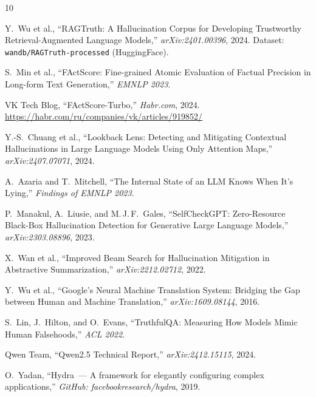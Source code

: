 \documentclass[a4paper,12pt]{extarticle}
\begin{document}
\begin{thebibliography}{10}

Y.~Wu et al.,
``RAGTruth: A Hallucination Corpus for Developing Trustworthy
Retrieval-Augmented Language Models,''
\textit{arXiv:2401.00396}, 2024.
Dataset: \texttt{wandb/RAGTruth-processed} (HuggingFace).

S.~Min et al.,
``FActScore: Fine-grained Atomic Evaluation of Factual Precision
in Long-form Text Generation,''
\textit{EMNLP 2023}.

VK Tech Blog,
``FActScore-Turbo,''
\textit{Habr.com}, 2024.
\url{https://habr.com/ru/companies/vk/articles/919852/}

Y.-S.~Chuang et al.,
``Lookback Lens: Detecting and Mitigating Contextual Hallucinations
in Large Language Models Using Only Attention Maps,''
\textit{arXiv:2407.07071}, 2024.

A.~Azaria and T.~Mitchell,
``The Internal State of an LLM Knows When It's Lying,''
\textit{Findings of EMNLP 2023}.

P.~Manakul, A.~Liusie, and M.\,J.\,F.~Gales,
``SelfCheckGPT: Zero-Resource Black-Box Hallucination Detection
for Generative Large Language Models,''
\textit{arXiv:2303.08896}, 2023.

X.~Wan et al.,
``Improved Beam Search for Hallucination Mitigation
in Abstractive Summarization,''
\textit{arXiv:2212.02712}, 2022.

Y.~Wu et al.,
``Google's Neural Machine Translation System: Bridging the Gap
between Human and Machine Translation,''
\textit{arXiv:1609.08144}, 2016.

S.~Lin, J.~Hilton, and O.~Evans,
``TruthfulQA: Measuring How Models Mimic Human Falsehoods,''
\textit{ACL 2022}.

Qwen Team,
``Qwen2.5 Technical Report,''
\textit{arXiv:2412.15115}, 2024.

O.~Yadan,
``Hydra~--- A framework for elegantly configuring complex applications,''
\textit{GitHub: facebookresearch/hydra}, 2019.

\end{thebibliography}
\end{document}
